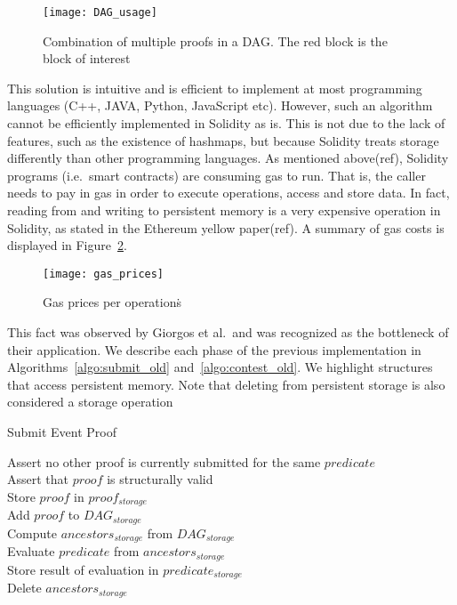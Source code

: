 \begin{figure}[hbt]
\centering
  \texttt{[image: DAG\_usage]}
  \caption{Combination of multiple proofs in a DAG. The red block is the block of interest}
\label{fig:DAG_usage}
\end{figure}

This solution is intuitive and is efficient to implement at most programming
languages (C++, JAVA, Python, JavaScript etc). However, such an algorithm
cannot be efficiently implemented in Solidity as is. This is not due to the
lack of features, such as the existence of hashmaps, but because Solidity
treats storage differently than other programming languages. As mentioned
above(ref), Solidity programs (i.e.\ smart contracts) are consuming gas to run.
That is, the caller needs to pay in gas in order to execute operations, access
and store data. In fact, reading from and writing to persistent memory is a
very expensive operation in Solidity, as stated in the Ethereum yellow
paper(ref). A summary of gas costs is displayed in Figure~\ref{fig:gas_prices}.

\begin{figure}[hbt]
\centering
  \texttt{[image: gas\_prices]}
  \caption{Gas prices per operations\.}
\label{fig:gas_prices}
\end{figure}

This fact was observed by Giorgos et al.\ and was recognized as the bottleneck
of their application. We describe each phase of the previous implementation in
Algorithms~\ref{algo:submit_old} and~\ref{algo:contest_old}. We highlight structures that access persistent memory. Note that
deleting from persistent storage is also considered a storage operation

\begin{algorithm}
\caption{Submit Event Proof}
\label{algo:submit_old}
Assert no other proof is currently submitted for the same $predicate$\\
Assert that $proof$ is structurally valid\\
Store $proof$ in $proof_{storage}$\\
Add $proof$ to $DAG_{storage}$\\
Compute $ancestors_{storage}$ from $DAG_{storage}$\\
Evaluate $predicate$ from $ancestors_{storage}$\\
Store result of evaluation in $predicate_{storage}$\\
Delete $ancestors_{storage}$\\
\end{algorithm}

